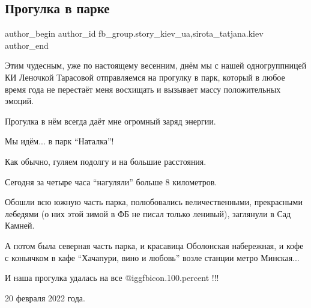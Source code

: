  
 
 
 
 
 
\subsection{Прогулка в парке}
\label{sec:21_02_2022.fb.fb_group.story_kiev_ua.2.progulka_v_parke}
 
\ifcmt
 author_begin
   author_id fb_group.story_kiev_ua,sirota_tatjana.kiev
 author_end
\fi

Этим чудесным, уже по настоящему весенним, днём мы с нашей одногруппницей КИ
Леночкой Тарасовой отправляемся на прогулку в парк, который в любое время года
не перестаёт меня восхищать и вызывает массу положительных эмоций.


Прогулка в нём всегда даёт мне огромный заряд энергии.

Мы идём... в парк \enquote{Наталка}!

Как обычно, гуляем подолгу и на большие расстояния.


Сегодня за четыре часа \enquote{нагуляли} больше 8 километров.


Обошли всю южную часть парка, полюбовались величественными, прекрасными
лебедями (о них этой зимой в ФБ не писал только ленивый), заглянули в Сад
Камней.


А потом была северная часть парка, и красавица Оболонская набережная, и кофе с
коньячком в кафе \enquote{Хачапури, вино и любовь} возле  станции метро
Минская...

И наша прогулка удалась на все  @igg{fbicon.100.percent} !!!

20 февраля 2022 года.


\raggedcolumns
\begin{multicols}{2} %
\setlength{\parindent}{0pt}



\end{multicols} %
